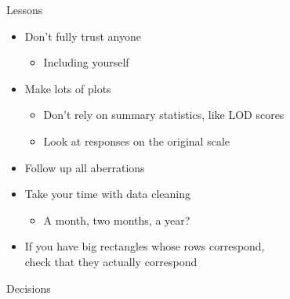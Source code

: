 \documentclass[12pt,t]{beamer}
\begin{document}
\begin{frame}[c]{Lessons}

\small

\begin{itemize}
\itemsep8pt

\item Don't fully trust anyone
\begin{itemize}
\item Including yourself
\end{itemize}

\item Make lots of plots
\begin{itemize}
\item Don't rely on summary statistics, like LOD scores
\item Look at responses on the original scale
\end{itemize}

\item Follow up all aberrations

\item Take your time with data cleaning
\begin{itemize}
\item A month, two months, a year?
\end{itemize}

\item If you have big rectangles whose rows correspond, \\
  check that they {\hilit actually} correspond

\end{itemize}
\note{}
\end{frame}




\begin{frame}[c]{Decisions}
\note{}
\end{frame}
\end{document}
